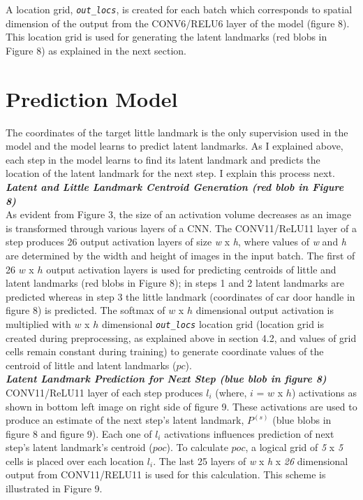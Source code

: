 \documentclass [11pt,letterpaper ,twoside ,openany ]{report}
\begin{document}
    A location grid, \textit{\texttt{out\_locs}},  is created for each batch which corresponds to spatial dimension of the output from the CONV6/RELU6 layer of the model (figure 8). This location grid is used for generating the latent landmarks (red blobs in Figure 8) as explained in the next section.

    \section{Prediction Model}
    The coordinates of the target little landmark is the only supervision used in the model and the model learns to predict latent landmarks. As I explained above, each step in the model learns to find its latent landmark and predicts the location of the latent landmark for the next step. I explain this process next.\\

    \noindent
    \textbf{\textit{Latent and Little Landmark Centroid Generation (red blob in Figure 8)}}\\
    As evident from Figure 3, the size of an activation volume decreases as an image is transformed through various layers of a CNN. The CONV11/ReLU11 layer of a step produces 26 output activation layers of size \textit {w} x \textit {h}, where values of \textit {w} and \textit {h} are determined by the width and height of images in the input batch. The first of 26 \(w\) x \(h\) output activation layers is used for predicting centroids of little and latent landmarks (red blobs in Figure 8); in steps 1 and 2 latent landmarks are predicted whereas in step 3 the little landmark (coordinates of car door handle in figure 8) is predicted. The softmax of \(w\) x \(h\) dimensional output activation is multiplied with \(w\) x \(h\) dimensional \textit{\texttt{out\_locs}} location grid (location grid is created during preprocessing, as explained above in section 4.2, and values of grid cells remain constant during training) to generate coordinate values of the centroid of little and latent landmarks (\(pc\)).\\

    \noindent
    \textbf{\textit{Latent Landmark Prediction for Next Step (blue blob in figure 8)}}\\
    CONV11/ReLU11 layer of each step produces \(l_i\) (where, \(i\) = \(w\) x \(h\)) activations as shown in bottom left image on right side of figure 9. These activations are used to produce an estimate of the next step's latent landmark, \(P^{(s)}\) (blue blobs in figure 8 and figure 9). Each one of \(l_i\) activations influences prediction of next step's latent landmark's centroid (\(poc\)). To calculate \(poc\), a logical grid of \textit {5} x \textit {5} cells is placed over each location \(l_i\). The last 25 layers of \textit {w} x \textit {h} x \textit {26} dimensional output from CONV11/RELU11 is used for this calculation. This scheme is illustrated in Figure 9.
\end{document}
